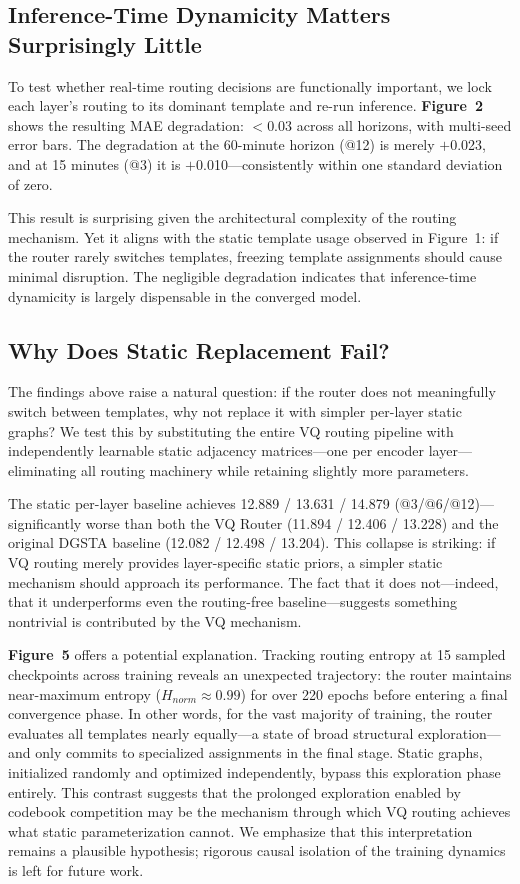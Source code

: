 \documentclass[journal]{IEEEtran}
\begin{document}
\subsection{Inference-Time Dynamicity Matters Surprisingly Little}

To test whether real-time routing decisions are functionally important, we lock each layer's routing to its dominant template and re-run inference. \textbf{Figure~2} shows the resulting MAE degradation: $<$0.03 across all horizons, with multi-seed error bars. The degradation at the 60-minute horizon (@12) is merely $+$0.023, and at 15 minutes (@3) it is $+$0.010---consistently within one standard deviation of zero.

This result is surprising given the architectural complexity of the routing mechanism. Yet it aligns with the static template usage observed in Figure~1: if the router rarely switches templates, freezing template assignments should cause minimal disruption. The negligible degradation indicates that inference-time dynamicity is largely dispensable in the converged model.

\subsection{Why Does Static Replacement Fail?}

The findings above raise a natural question: if the router does not meaningfully switch between templates, why not replace it with simpler per-layer static graphs? We test this by substituting the entire VQ routing pipeline with independently learnable static adjacency matrices---one per encoder layer---eliminating all routing machinery while retaining slightly more parameters.

The static per-layer baseline achieves 12.889 / 13.631 / 14.879 (@3/@6/@12)---significantly worse than both the VQ Router (11.894 / 12.406 / 13.228) and the original DGSTA baseline (12.082 / 12.498 / 13.204). This collapse is striking: if VQ routing merely provides layer-specific static priors, a simpler static mechanism should approach its performance. The fact that it does not---indeed, that it underperforms even the routing-free baseline---suggests something nontrivial is contributed by the VQ mechanism.

\textbf{Figure~5} offers a potential explanation. Tracking routing entropy at 15 sampled checkpoints across training reveals an unexpected trajectory: the router maintains near-maximum entropy ($H_{norm} \approx 0.99$) for over 220 epochs before entering a final convergence phase. In other words, for the vast majority of training, the router evaluates all templates nearly equally---a state of broad structural exploration---and only commits to specialized assignments in the final stage. Static graphs, initialized randomly and optimized independently, bypass this exploration phase entirely. This contrast suggests that the prolonged exploration enabled by codebook competition may be the mechanism through which VQ routing achieves what static parameterization cannot. We emphasize that this interpretation remains a plausible hypothesis; rigorous causal isolation of the training dynamics is left for future work.
\end{document}
